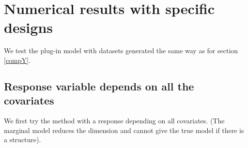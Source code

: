 \documentclass[12pt,a4paper]{report}
\begin{document}
%		
%		
%
				
		
		
	\section{Numerical results with specific designs} \label{resnumpred}
		We test the plug-in model with datasets generated the same way as for section \ref{compY}.		
\subsection{Response variable depends on all the covariates}	
We first try the method with a response depending on all covariates. (The marginal model reduces the dimension and cannot give the true model if there is a structure).
\end{document}
